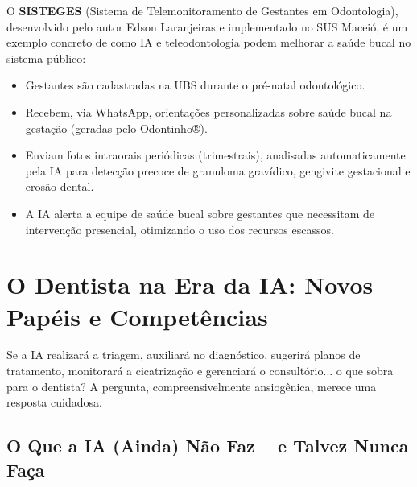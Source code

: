 O \textbf{SISTEGES} (Sistema de Telemonitoramento de Gestantes em Odontologia),
desenvolvido pelo autor Edson Laranjeiras e implementado no SUS Maceió, é um
exemplo concreto de como IA e teleodontologia podem melhorar a saúde bucal no
sistema público:

\begin{itemize}
  \item Gestantes são cadastradas na UBS durante o pré-natal odontológico.
  \item Recebem, via WhatsApp, orientações personalizadas sobre saúde bucal na
    gestação (geradas pelo Odontinho®).
  \item Enviam fotos intraorais periódicas (trimestrais), analisadas
    automaticamente pela IA para detecção precoce de granuloma gravídico,
    gengivite gestacional e erosão dental.
  \item A IA alerta a equipe de saúde bucal sobre gestantes que necessitam de
    intervenção presencial, otimizando o uso dos recursos escassos.
\end{itemize}


 

\section{O Dentista na Era da IA: Novos Papéis e Competências}
\label{sec:dentista-era-ia}

\nivelquatro

Se a IA realizará a triagem, auxiliará no diagnóstico, sugerirá planos de
tratamento, monitorará a cicatrização e gerenciará o consultório... o que sobra
para o dentista? A pergunta, compreensivelmente ansiogênica, merece uma resposta
cuidadosa.


\subsection{O Que a IA (Ainda) Não Faz -- e Talvez Nunca Faça}

